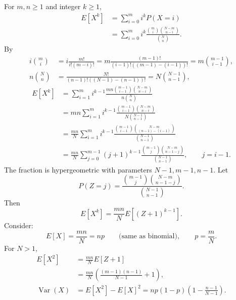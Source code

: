 For $m,n\ge1$ and integer $k\ge1$,
\begin{align*}
  E[X^k] & =\sum_{i=0}^m i^kP(X=i)                                       \\
         & =\sum_{i=0}^m i^k\frac{\binom mi\binom{N-m}{n-i}}{\binom Nn}.
\end{align*}
By
\begin{align*}
  i\binom mi & =i\frac{m!}{i!(m-i)!}
  =m\frac{(m-1)!}{(i-1)!((m-1)-(i-1))!}
  =m\binom{m-1}{i-1},                           \\
  n\binom Nn & =\frac{N!}{(n-1)!((N-1)-(n-1))!}
  =N\binom{N-1}{n-1},
\end{align*}
\begin{align*}
  E[X^k] & =\sum_{i=1}^m i^{k-1}
  \frac{mn\binom{m-1}{i-1}\binom{N-m}{n-i}}{n\binom Nn}             \\
         & =mn\sum_{i=1}^m i^{k-1}
  \frac{\binom{m-1}{i-1}\binom{N-m}{n-i}}{N\binom{N-1}{n-1}}        \\
         & =\frac{mn}N\sum_{i=1}^m i^{k-1}
  \frac{\binom{m-1}{i-1}\binom{N-m}{(n-1)-(i-1)}}{\binom{N-1}{n-1}} \\
         & =\frac{mn}N\sum_{j=0}^{m-1}(j+1)^{k-1}
  \frac{\binom{m-1}j\binom{N-m}{n-1-j}}{\binom{N-1}{n-1}},\qquad j=i-1.
\end{align*}
The fraction is hypergeometric with parameters $N-1,m-1,n-1$.
Let
\[
  P(Z=j)=\frac{\binom{m-1}j\binom{N-m}{n-1-j}}{\binom{N-1}{n-1}}.
\]
Then
\[
  E[X^k]=\frac{mn}N E[(Z+1)^{k-1}].
\]
Consider:
\[
  E[X]=\frac{mn}N=np\qquad\text{(same as binomial)},\qquad p=\frac mN.
\]
For $N>1$,
\begin{align*}
  E[X^2]                & =\frac{mn}N E[Z+1]                                \\
                        & =\frac{mn}N\left(\frac{(m-1)(n-1)}{N-1}+1\right), \\
  \operatorname{Var}(X) & =E[X^2]-E[X]^2
  =np(1-p)\left(1-\frac{n-1}{N-1}\right).
\end{align*}
